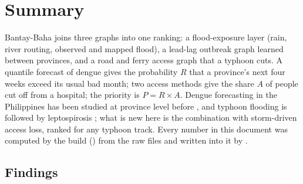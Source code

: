 \section{Summary}
\label{sec:summary}

Bantay-Baha joins three graphs into one ranking: a flood-exposure layer (rain, river routing, observed and mapped flood), a lead-lag outbreak graph learned between provinces, and a road and ferry access graph that a typhoon cuts. A quantile forecast of dengue gives the probability $R$ that a province's next four weeks exceed its usual bad month; two access methods give the share $A$ of people cut off from a hospital; the priority is $P = R \times A$. Dengue forecasting in the Philippines has been studied at province level before \parencite{buczak2014}, and typhoon flooding is followed by leptospirosis \parencite{balbuena2010}; what is new here is the combination with storm-driven access loss, ranked for any typhoon track. Every number in this document was computed by the build () from the raw files and written into it by .

\subsection{Findings}

